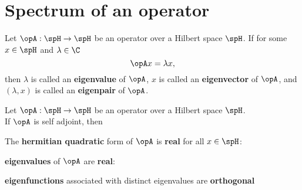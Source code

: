 \section{Spectrum of an operator}
\begin{definition}
 
Let $\opA:\spH\to\spH$ be an operator over a Hilbert space $\spH$.
If for some $x\in\spH$ and $\lambda\in\C$
\[ \opA x = \lambda x, \]
then $\lambda$ is called an {\bf eigenvalue} of $\opA$,
$x$ is called an {\bf eigenvector} of $\opA$, and
$(\lambda,x)$ is called an {\bf eigenpair} of $\opA$.
\end{definition}

\begin{theorem}
Let $\opA:\spH\to\spH$ be an operator over a Hilbert space $\spH$.\\
If $\opA$ is self adjoint, then
\begin{enume}
   \item The {\bf hermitian quadratic} form of $\opA$ is {\bf real} for all $x\in\spH$:
   \item {\bf eigenvalues} of $\opA$ are {\bf real}:
   \item {\bf eigenfunctions} associated with distinct eigenvalues are {\bf orthogonal}
\end{enume}

\end{theorem}

